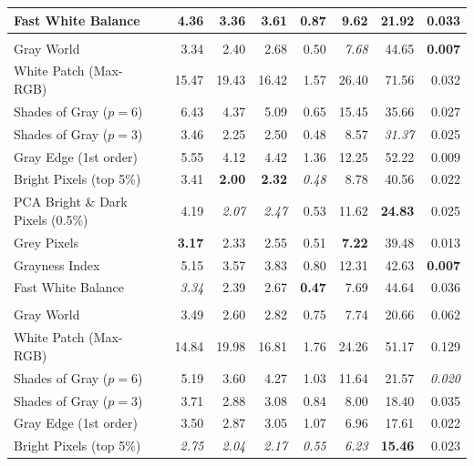 \begin{longtable}{@{}>{\raggedright\arraybackslash}p{6.8cm}rrrrrrr@{}}
Fast White Balance~\cite{fast_wb_greyness} & 4.36 & 3.36 & 3.61 & 0.87 & 9.62 & 21.92 & 0.033 \\
\midrule
\multicolumn{8}{@{}l}{\textbf{Cube++~\cite{ershov2020cube} ($N=4866$)}} \\
\midrule
Gray World~\cite{gray_world} & 3.34 & 2.40 & 2.68 & 0.50 & \textit{7.68} & 44.65 & \textbf{0.007} \\
White Patch (Max-RGB)~\cite{white_patch} & 15.47 & 19.43 & 16.42 & 1.57 & 26.40 & 71.56 & 0.032 \\
Shades of Gray ($p=6$)~\cite{shades_of_gray} & 6.43 & 4.37 & 5.09 & 0.65 & 15.45 & 35.66 & 0.027 \\
Shades of Gray ($p=3$)~\cite{shades_of_gray} & 3.46 & 2.25 & 2.50 & 0.48 & 8.57 & \textit{31.37} & 0.025 \\
Gray Edge (1st order)~\cite{gray_edge} & 5.55 & 4.12 & 4.42 & 1.36 & 12.25 & 52.22 & 0.009 \\
Bright Pixels (top 5\%)~\cite{bright_pixels} & 3.41 & \textbf{2.00} & \textbf{2.32} & \textit{0.48} & 8.78 & 40.56 & 0.022 \\
PCA Bright \& Dark Pixels (0.5\%)~\cite{cheng2014illuminant} & 4.19 & \textit{2.07} & \textit{2.47} & 0.53 & 11.62 & \textbf{24.83} & 0.025 \\
Grey Pixels~\cite{yangGrayPixels} & \textbf{3.17} & 2.33 & 2.55 & 0.51 & \textbf{7.22} & 39.48 & 0.013 \\
Grayness Index~\cite{qianFindingGrayPixels} & 5.15 & 3.57 & 3.83 & 0.80 & 12.31 & 42.63 & \textbf{0.007} \\
Fast White Balance~\cite{fast_wb_greyness} & \textit{3.34} & 2.39 & 2.67 & \textbf{0.47} & 7.69 & 44.64 & 0.036 \\
\midrule
\multicolumn{8}{@{}l}{\textbf{NUS 8-Camera~\cite{cheng2014illuminant} ($N=1736$)}} \\
\midrule
Gray World~\cite{gray_world} & 3.49 & 2.60 & 2.82 & 0.75 & 7.74 & 20.66 & 0.062 \\
White Patch (Max-RGB)~\cite{white_patch} & 14.84 & 19.98 & 16.81 & 1.76 & 24.26 & 51.17 & 0.129 \\
Shades of Gray ($p=6$)~\cite{shades_of_gray} & 5.19 & 3.60 & 4.27 & 1.03 & 11.64 & 21.57 & \textit{0.020} \\
Shades of Gray ($p=3$)~\cite{shades_of_gray} & 3.71 & 2.88 & 3.08 & 0.84 & 8.00 & 18.40 & 0.035 \\
Gray Edge (1st order)~\cite{gray_edge} & 3.50 & 2.87 & 3.05 & 1.07 & 6.96 & 17.61 & 0.022 \\
Bright Pixels (top 5\%)~\cite{bright_pixels} & \textit{2.75} & \textit{2.04} & \textit{2.17} & \textit{0.55} & \textit{6.23} & \textbf{15.46} & 0.023 \\

\end{longtable}
